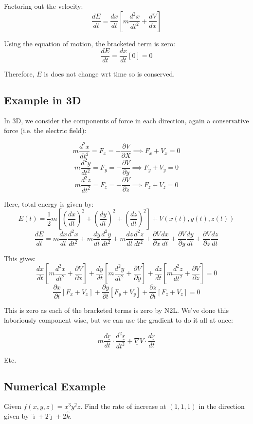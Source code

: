Factoring out the velocity:
\[
    \frac{dE}{dt} = \frac{dx}{dt} \left[m \frac{d^2 x}{dt^2} + \frac{dV}{dx}\right]
\]

Using the equation of motion, the bracketed term is zero:
\[
    \frac{dE}{dt} = \frac{dx}{dt} \left[ 0 \right] = 0
\]

Therefore, $E$ is does not change wrt time so is conserved.

\subsection{Example in 3D}
In 3D, we consider the components of force in each direction, again a conservative force (i.e. the electric field):

\[
    m \frac{d^2 x}{dt^2} = F_x = -\frac{\partial V}{\partial X} \implies F_x + V_x = 0
\]
\[
    m \frac{d^2 y}{dt^2} = F_y = - \frac{\partial V}{\partial y} \implies F_y + V_y = 0
\]
\[
    m \frac{d^2 z}{dt^2} = F_z = - \frac{\partial V}{\partial z} \implies F_z + V_z = 0
\]

Here, total energy is given by:
\[
    E(t) = \frac{1}{2}m \left[\left(\frac{dx}{dt}\right)^2 + \left(\frac{dy}{dt}\right)^2 + \left(\frac{dz}{dt}\right)^2\right] + V(x(t), y(t), z(t))
\]
\[
    \frac{dE}{dt} = m \frac{dx}{dt} \frac{d^2 x}{dt^2} + m \frac{dy}{dt} \frac{d^2 y}{dt^2} + m \frac{dz}{dt} \frac{d^2 z}{dt^2} + \frac{\partial V}{\partial x} \frac{dx}{dt} + \frac{\partial V}{\partial y} \frac{dy}{dt} + \frac{\partial V}{\partial z} \frac{dz}{dt}
\]

This gives:
\[
    \frac{dx}{dt} \left[m \frac{d^2 x}{dt^2} + \frac{\partial V}{\partial x}\right] + \frac{dy}{dt} \left[m \frac{d^2 y}{dt^2} + \frac{\partial V}{\partial y}\right] + \frac{dz}{dt} \left[m \frac{d^2 z}{dt^2} + \frac{\partial V}{\partial z}\right] = 0
\]
\[
    \frac{\partial x}{\partial t} \left[F_x + V_x\right] + \frac{\partial y}{\partial t} \left[F_y + V_y\right] + \frac{\partial z}{\partial t} \left[F_z + V_z\right] = 0
\]


This is zero as each of the bracketed terms is zero by N2L. We've done this laboriously component wise, but we can use the gradient to do it all at once:

\[
    m \frac{d \underline{r}}{dt} \cdot \frac{d^2 \underline{r}}{dt^2} + \underline{\nabla} V \cdot \frac{d \underline{r}}{dt} 
\]

Etc.

\subsection{Numerical Example}
Given $f(x, y, z) = x^3 y^2 z$. Find the rate of increase at $(1, 1, 1)$ in the direction given by $\hat{\imath} + 2 \hat{\jmath} + 2 \hat{k}$.

